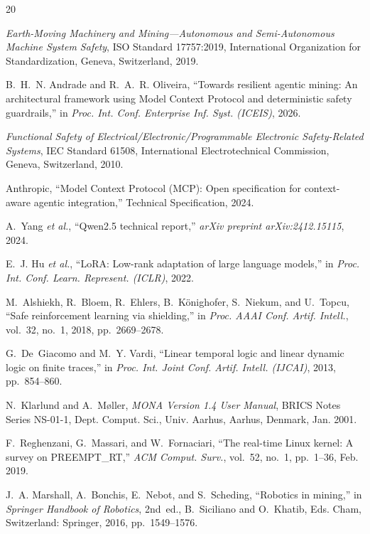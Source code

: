 \documentclass{ieeeaccess}
\begin{document}
\begin{thebibliography}{20}

\emph{Earth-Moving Machinery and Mining---Autonomous and Semi-Autonomous Machine System Safety}, ISO Standard 17757:2019, International Organization for Standardization, Geneva, Switzerland, 2019.

B.~H.~N. Andrade and R.~A.~R. Oliveira, ``Towards resilient agentic mining: An architectural framework using Model Context Protocol and deterministic safety guardrails,'' in \emph{Proc. Int. Conf. Enterprise Inf. Syst. (ICEIS)}, 2026.

\emph{Functional Safety of Electrical/Electronic/Programmable Electronic Safety-Related Systems}, IEC Standard 61508, International Electrotechnical Commission, Geneva, Switzerland, 2010.

Anthropic, ``Model Context Protocol (MCP): Open specification for context-aware agentic integration,'' Technical Specification, 2024.

A.~Yang \emph{et al.}, ``Qwen2.5 technical report,'' \emph{arXiv preprint arXiv:2412.15115}, 2024.

E.~J. Hu \emph{et al.}, ``LoRA: Low-rank adaptation of large language models,'' in \emph{Proc. Int. Conf. Learn. Represent. (ICLR)}, 2022.

M.~Alshiekh, R.~Bloem, R.~Ehlers, B.~K{\"o}nighofer, S.~Niekum, and U.~Topcu, ``Safe reinforcement learning via shielding,'' in \emph{Proc. AAAI Conf. Artif. Intell.}, vol.~32, no.~1, 2018, pp.~2669--2678.

G.~De~Giacomo and M.~Y. Vardi, ``Linear temporal logic and linear dynamic logic on finite traces,'' in \emph{Proc. Int. Joint Conf. Artif. Intell. (IJCAI)}, 2013, pp.~854--860.

N.~Klarlund and A.~M{\o}ller, \emph{MONA Version 1.4 User Manual}, BRICS Notes Series NS-01-1, Dept. Comput. Sci., Univ. Aarhus, Aarhus, Denmark, Jan. 2001.

F.~Reghenzani, G.~Massari, and W.~Fornaciari, ``The real-time Linux kernel: A survey on PREEMPT\_RT,'' \emph{ACM Comput. Surv.}, vol.~52, no.~1, pp.~1--36, Feb. 2019.

J.~A. Marshall, A.~Bonchis, E.~Nebot, and S.~Scheding, ``Robotics in mining,'' in \emph{Springer Handbook of Robotics}, 2nd~ed., B.~Siciliano and O.~Khatib, Eds. Cham, Switzerland: Springer, 2016, pp.~1549--1576.


\end{thebibliography}
\end{document}
